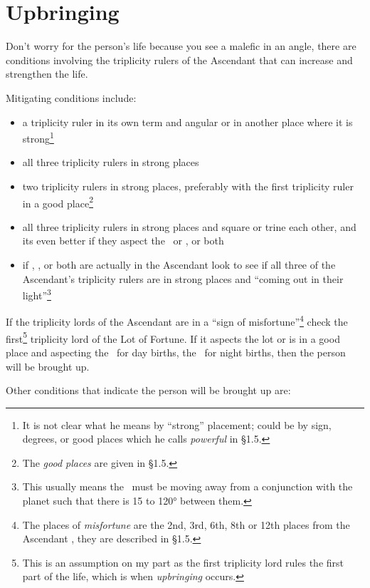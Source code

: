 \section{Upbringing}
\label{sec:upbringing}
Don't worry for the person's life because you see a malefic in an angle, there are conditions involving the triplicity rulers of the Ascendant that can increase and strengthen the life. 

Mitigating conditions include:
\begin{itemize}[topsep=0pt,itemsep=0pt]

\item a triplicity ruler in its own term and angular or in another place where it is strong\footnote{It is not clear what he means by ``strong'' placement; could be by sign, degrees, or good places which he calls \textsl{powerful} in \S1.5.}

\item all three triplicity rulers in strong places

\item two triplicity rulers in strong places, preferably with the first triplicity ruler in a good place\footnote{The \textsl{good places} are given in \S1.5.}

\item all three triplicity rulers in strong places and square or trine each other, and its even better if they aspect the \Sun\, or \Moon, or both 

\item if \Saturn, \Mars, or both are actually in the Ascendant look to see if all three of the Ascendant's triplicity rulers are in strong places and ``coming out in their light''\footnote{This usually means the \Sun\, must be moving away from a conjunction with the planet such that there is 15 to 120° between them.}
\end{itemize}

If the triplicity lords of the Ascendant are in a ``sign of misfortune''\footnote{The places of \textsl{misfortune} are the 2nd, 3rd, 6th, 8th or 12th places from the Ascendant , they are described in \S1.5.} check the first\footnote{This is an assumption on my part as the first triplicity lord rules the first part of the life, which is when \textsl{upbringing} occurs.} triplicity lord of the Lot of Fortune. If it aspects the lot or is in a good place and aspecting the \Sun\, for day births, the \Moon\, for night births, then the person will be brought up.

Other conditions that indicate the person will be brought up are:

